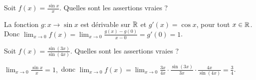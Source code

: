 \begin{question} 
Soit $f(x)= \frac{\sin x}{x}$. Quelles sont les assertions vraies ?
\begin{answers}

    
    
    
    
  
\end{answers}
\begin{explanations}
La fonction $g: x\to \sin x$ est dérivable sur $\mathbb{R}$  et $g'(x)= \cos x$, pour tout $x\in \mathbb{R}$. Donc  $\lim_{x\to 0}f(x)= \lim_{x\to 0}\frac{g(x)-g(0)}{x-0} = g'(0)=1$.
\end{explanations}

\end{question}



\begin{question} 
Soit $f(x)= \frac{\sin(3x)}{\sin(4x)}$. Quelles sont les assertions vraies ?
\begin{answers}

    
    
    
    

 
\end{answers}
\begin{explanations}
$\lim_{x\to 0}\frac{\sin x}{x} = 1,$ donc $\lim_{x\to 0} f(x)= \lim_{x\to 0}\frac{3x}{4x} \cdot  \frac{\sin (3x)}{3x}\cdot  \frac{4x}{\sin(4x)} = \frac{3}{4}$.
\end{explanations}

\end{question}



